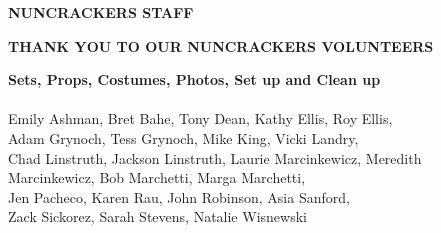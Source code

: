 \documentclass[12pt, a5paper, oneside]{article}
\begin{document}
\begin{center}
\Large \textbf{NUNCRACKERS STAFF}
\end{center}
\raggedright
\begin{center}
    \Large\textbf{THANK YOU TO OUR NUNCRACKERS VOLUNTEERS}\\
\end{center}
\begin{center}
\textbf{Sets, Props, Costumes, Photos, Set up and Clean up}\\
\hfill\\
Emily Ashman, Bret Bahe, Tony Dean, Kathy Ellis, Roy Ellis,\\ Adam Grynoch, Tess Grynoch, Mike King, Vicki Landry,\\ Chad Linstruth, Jackson Linstruth, Laurie Marcinkewicz, Meredith Marcinkewicz, Bob Marchetti, Marga Marchetti,\\ Jen Pacheco, Karen Rau, John Robinson, Asia Sanford,\\ Zack Sickorez, Sarah Stevens, Natalie Wisnewski
\end{center}
\pagebreak
\end{document}
